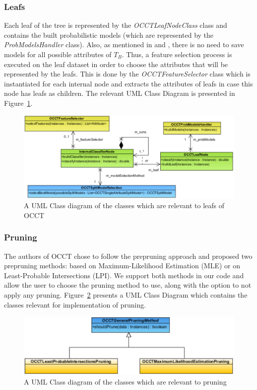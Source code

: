 \documentclass[a4paper,12pt]{article}
\begin{document}
\begin{spacing}{1.5}
\subsubsection{Leafs}
Each leaf of the tree is represented by the {\em OCCTLeafNodeClass} class and contains the built probabilistic models (which are represented by the {\em ProbModelsHandler} class). Also, as mentioned in \cite{dror2011thesis} and \cite{dror2014occt}, there is no need to save models for all possible attributes of $T_B$. Thus, a feature selection process is executed on the leaf dataset in order to choose the attributes that will be represented by the leafs. This is done by the {\em OCCTFeatureSelector} class which is instantiated for each internal node and extracts the attributes of leafs in case this node has leafs as children. The relevant UML Class Diagram is presented in Figure~\ref{fig:leafs}.
\vspace{0.5cm}
\begin{figure}[!h]
    \centering
    \includegraphics[width=1\textwidth]{Figures/ClassDiagrams/PDF/Leafs.pdf}
    \caption{A UML Class diagram of the classes which are relevant to leafs of OCCT}
    \label{fig:leafs}
\end{figure}

\subsubsection{Pruning}
The authors of OCCT chose to follow the prepruning approach and proposed two prepruning methods: based on Maximum-Likelihood Estimation (MLE) or on Least-Probable Intersections (LPI). We support both methods in our code and allow the user to choose the pruning method to use, along with the option to not apply any pruning. Figure~\ref{fig:pruning} presents a UML Class Diagram which contains the classes relevant for implementation of pruning.
\vspace{0.5cm}
\begin{figure}[!h]
    \centering
    \includegraphics[width=1\textwidth]{Figures/ClassDiagrams/PDF/Pruning.pdf}
    \caption{A UML Class diagram of the classes which are relevant to pruning}
    \label{fig:pruning}
\end{figure}


\end{spacing}
\end{document}

